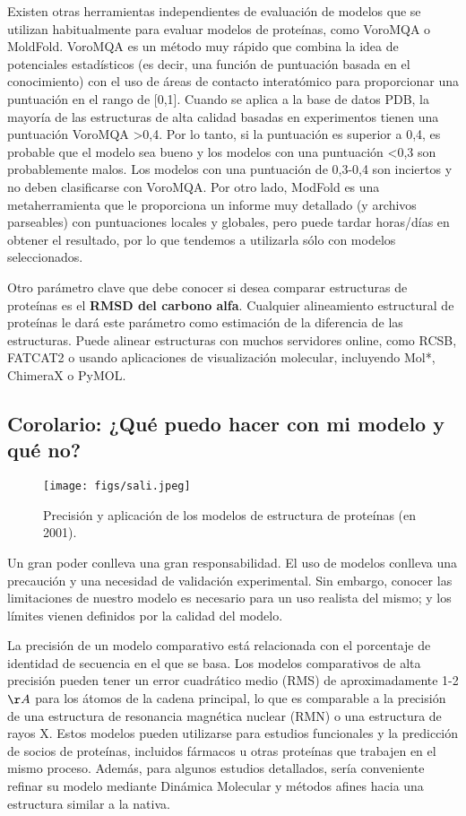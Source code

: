 Existen otras herramientas independientes de evaluación de modelos que se utilizan habitualmente para evaluar modelos de proteínas, como VoroMQA o MoldFold. VoroMQA es un método muy rápido que combina la idea de potenciales estadísticos (es decir, una función de puntuación basada en el conocimiento) con el uso de áreas de contacto interatómico para proporcionar una puntuación en el rango de [0,1]. Cuando se aplica a la base de datos PDB, la mayoría de las estructuras de alta calidad basadas en experimentos tienen una puntuación VoroMQA >0,4. Por lo tanto, si la puntuación es superior a 0,4, es probable que el modelo sea bueno y los modelos con una puntuación <0,3 son probablemente malos. Los modelos con una puntuación de 0,3-0,4 son inciertos y no deben clasificarse con VoroMQA. Por otro lado, ModFold es una metaherramienta que le proporciona un informe muy detallado (y archivos parseables) con puntuaciones locales y globales, pero puede tardar horas/días en obtener el resultado, por lo que tendemos a utilizarla sólo con modelos seleccionados.

Otro parámetro clave que debe conocer si desea comparar estructuras de proteínas es el \textbf{RMSD del carbono alfa}. Cualquier alineamiento estructural de proteínas le dará este parámetro como estimación de la diferencia de las estructuras. Puede alinear estructuras con muchos servidores online, como RCSB, FATCAT2 o usando aplicaciones de visualización molecular, incluyendo Mol*, ChimeraX o PyMOL.

\subsection{Corolario: ¿Qué puedo hacer con mi modelo y qué no?}
\begin{figure}[h]
\centering
\texttt{[image: figs/sali.jpeg]}
\caption{Precisión y aplicación de los modelos de estructura de proteínas (en 2001).}
\end{figure}

Un gran poder conlleva una gran responsabilidad. El uso de modelos conlleva una precaución y una necesidad de validación experimental. Sin embargo, conocer las limitaciones de nuestro modelo es necesario para un uso realista del mismo; y los límites vienen definidos por la calidad del modelo.

La precisión de un modelo comparativo está relacionada con el porcentaje de identidad de secuencia en el que se basa. Los modelos comparativos de alta precisión pueden tener un error cuadrático medio (RMS) de aproximadamente 1-2 $\AA$ para los átomos de la cadena principal, lo que es comparable a la precisión de una estructura de resonancia magnética nuclear (RMN) o una estructura de rayos X. Estos modelos pueden utilizarse para estudios funcionales y la predicción de socios de proteínas, incluidos fármacos u otras proteínas que trabajen en el mismo proceso. Además, para algunos estudios detallados, sería conveniente refinar su modelo mediante Dinámica Molecular y métodos afines hacia una estructura similar a la nativa. 

